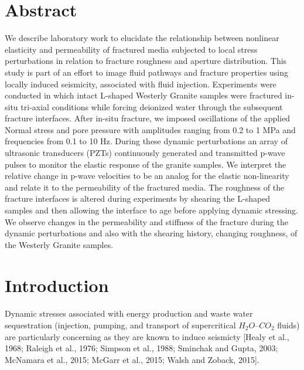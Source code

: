 \documentclass[letterpaper,10pt]{article}
\begin{document}
\section{Abstract}
We describe laboratory work to elucidate the relationship between nonlinear elasticity and
permeability of fractured media subjected to local stress perturbations in relation to fracture
roughness and aperture distribution. This study is part of an effort to image fluid pathways and
fracture properties using locally induced seismicity, associated with fluid injection. Experiments were conducted in which intact L-shaped Westerly Granite samples were fractured in-situ tri-axial conditions while forcing deionized water through the subsequent fracture interfaces. After in-situ fracture, we imposed oscillations of the applied Normal stress and pore pressure with amplitudes ranging from 0.2 to 1 MPa and frequencies from 0.1 to 10 Hz. During these dynamic perturbations an array of ultrasonic transducers (PZTs) continuously generated and transmitted p-wave pulses to monitor the elastic response of the granite samples. We interpret the relative change in p-wave velocities to be an analog for the elastic non-linearity and relate it to the permeability of the fractured media. The roughness of the fracture interfaces is altered during experiments by shearing the L-shaped samples and then allowing the interface to age before applying dynamic stressing. We observe changes in the permeability and stiffness of the fracture during the dynamic perturbations and also with the shearing history, changing roughness, of the Westerly Granite samples.

\pagebreak
\section{Introduction}

\paragraph{} Dynamic stresses associated with energy production and waste water sequestration (injection, pumping, and transport of supercritical $H_{2}O$--$CO_{2}$ fluids) are particularly concerning as they are known to induce seismicty [Healy et al., 1968; Raleigh et al., 1976; Simpson et al., 1988; Sminchak and Gupta, 2003; McNamara et al., 2015; McGarr et al., 2015; Walsh and Zoback, 2015]. 
\end{document}
